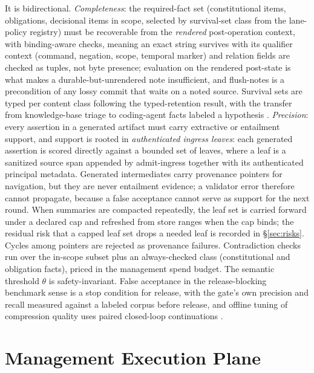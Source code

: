 \documentclass[11pt]{article}
\begin{document}
It is bidirectional. \emph{Completeness}: the required-fact set (constitutional items, obligations, decisional items in scope, selected by survival-set class from the lane-policy registry) must be recoverable from the \emph{rendered} post-operation context, with binding-aware checks, meaning an exact string survives with its qualifier context (command, negation, scope, temporal marker) and relation fields are checked as tuples, not byte presence; evaluation on the rendered post-state is what makes a durable-but-unrendered note insufficient, and flush-notes is a precondition of any lossy commit that waits on a noted source. Survival sets are typed per content class following the typed-retention result, with the transfer from knowledge-base triage to coding-agent facts labeled a hypothesis \cite{cliff2026}. \emph{Precision}: every assertion in a generated artifact must carry extractive or entailment support, and support is rooted in \emph{authenticated ingress leaves}: each generated assertion is scored directly against a bounded set of leaves, where a leaf is a sanitized source span appended by admit-ingress together with its authenticated principal metadata. Generated intermediates carry provenance pointers for navigation, but they are never entailment evidence; a validator error therefore cannot propagate, because a false acceptance cannot serve as support for the next round. When summaries are compacted repeatedly, the leaf set is carried forward under a declared cap and refreshed from store ranges when the cap binds; the residual risk that a capped leaf set drops a needed leaf is recorded in \S\ref{sec:risks}. Cycles among pointers are rejected as provenance failures. Contradiction checks run over the in-scope subset plus an always-checked class (constitutional and obligation facts), priced in the management spend budget. The semantic threshold $\theta$ is safety-invariant. False acceptance in the release-blocking benchmark sense is a stop condition for release, with the gate's own precision and recall measured against a labeled corpus before release, and offline tuning of compression quality uses paired closed-loop continuations \cite{trace2026}.

\section{Management Execution Plane}
\end{document}
